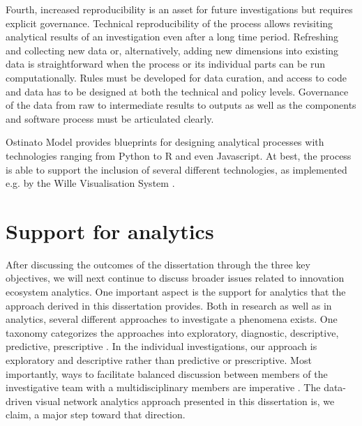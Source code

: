 Fourth, increased reproducibility is an asset for future investigations but requires explicit governance. Technical reproducibility of the process allows revisiting analytical results of an investigation even after a long time period. Refreshing and collecting new data or, alternatively, adding new dimensions into existing data is straightforward when the process or its individual parts can be run computationally. Rules must be developed for data curation, and access to code and data has to be designed at both the technical and policy levels. 
Governance of the data from raw to intermediate results to outputs as well as the components and software process must be articulated clearly.

Ostinato Model provides blueprints for designing analytical processes with technologies ranging from Python to R and even Javascript. At best, the process is able to support the inclusion of several different technologies, as implemented e.g. by the Wille Visualisation System \citep{Nykanen2008}.

\section{Support for analytics}

After discussing the outcomes of the dissertation through the three key objectives, we will next continue to discuss broader issues related to innovation ecosystem analytics. One important aspect is the support for analytics that the approach derived in this dissertation provides. Both in research as well as in analytics, several different approaches to investigate a phenomena exists. One taxonomy categorizes the approaches into exploratory, diagnostic, descriptive, predictive, prescriptive \citep{Davenport2013Analytics3.0}. 
In the individual investigations, our approach is exploratory and descriptive rather than predictive or prescriptive. Most importantly, ways to facilitate balanced discussion between members of the investigative team with a multidisciplinary members are imperative \citep[cf.][]{Pentland2015,Nunamaker2011TowardSystems}. The data-driven visual network analytics approach presented in this dissertation is, we claim, a major step toward that direction.

